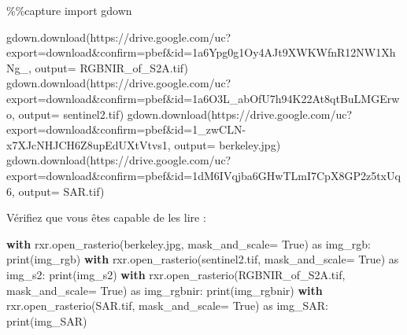 \documentclass[
  11pt,
  letterpaper,
  open=any,
  twoside=false,
  french]{scrbook}
\newenvironment{Shaded}{\begin{snugshade}}{\end{snugshade}}
\newcommand{\BuiltInTok}[1]{\textcolor[rgb]{0.00,0.23,0.31}{#1}}
\newcommand{\ControlFlowTok}[1]{\textcolor[rgb]{0.00,0.23,0.31}{\textbf{#1}}}
\newcommand{\ImportTok}[1]{\textcolor[rgb]{0.00,0.46,0.62}{#1}}
\newcommand{\NormalTok}[1]{\textcolor[rgb]{0.00,0.23,0.31}{#1}}
\newcommand{\OperatorTok}[1]{\textcolor[rgb]{0.37,0.37,0.37}{#1}}
\newcommand{\StringTok}[1]{\textcolor[rgb]{0.13,0.47,0.30}{#1}}
\newcommand{\VariableTok}[1]{\textcolor[rgb]{0.07,0.07,0.07}{#1}}
\begin{document}
\begin{Shaded}
\begin{Highlighting}[]
\OperatorTok{\%\%}\NormalTok{capture}
\ImportTok{import}\NormalTok{ gdown}

\NormalTok{gdown.download(}\StringTok{\textquotesingle{}https://drive.google.com/uc?export=download\&confirm=pbef\&id=1a6Ypg0g1Oy4AJt9XWKWfnR12NW1XhNg\_\textquotesingle{}}\NormalTok{, output}\OperatorTok{=} \StringTok{\textquotesingle{}RGBNIR\_of\_S2A.tif\textquotesingle{}}\NormalTok{)}
\NormalTok{gdown.download(}\StringTok{\textquotesingle{}https://drive.google.com/uc?export=download\&confirm=pbef\&id=1a6O3L\_abOfU7h94K22At8qtBuLMGErwo\textquotesingle{}}\NormalTok{, output}\OperatorTok{=} \StringTok{\textquotesingle{}sentinel2.tif\textquotesingle{}}\NormalTok{)}
\NormalTok{gdown.download(}\StringTok{\textquotesingle{}https://drive.google.com/uc?export=download\&confirm=pbef\&id=1\_zwCLN{-}x7XJcNHJCH6Z8upEdUXtVtvs1\textquotesingle{}}\NormalTok{, output}\OperatorTok{=} \StringTok{\textquotesingle{}berkeley.jpg\textquotesingle{}}\NormalTok{)}
\NormalTok{gdown.download(}\StringTok{\textquotesingle{}https://drive.google.com/uc?export=download\&confirm=pbef\&id=1dM6IVqjba6GHwTLmI7CpX8GP2z5txUq6\textquotesingle{}}\NormalTok{, output}\OperatorTok{=} \StringTok{\textquotesingle{}SAR.tif\textquotesingle{}}\NormalTok{)}
\end{Highlighting}
\end{Shaded}

Vérifiez que vous êtes capable de les lire :

\begin{Shaded}
\begin{Highlighting}[]
\ControlFlowTok{with}\NormalTok{ rxr.open\_rasterio(}\StringTok{\textquotesingle{}berkeley.jpg\textquotesingle{}}\NormalTok{, mask\_and\_scale}\OperatorTok{=} \VariableTok{True}\NormalTok{) }\ImportTok{as}\NormalTok{ img\_rgb:}
    \BuiltInTok{print}\NormalTok{(img\_rgb)}
\ControlFlowTok{with}\NormalTok{ rxr.open\_rasterio(}\StringTok{\textquotesingle{}sentinel2.tif\textquotesingle{}}\NormalTok{, mask\_and\_scale}\OperatorTok{=} \VariableTok{True}\NormalTok{) }\ImportTok{as}\NormalTok{ img\_s2:}
    \BuiltInTok{print}\NormalTok{(img\_s2)}
\ControlFlowTok{with}\NormalTok{ rxr.open\_rasterio(}\StringTok{\textquotesingle{}RGBNIR\_of\_S2A.tif\textquotesingle{}}\NormalTok{, mask\_and\_scale}\OperatorTok{=} \VariableTok{True}\NormalTok{) }\ImportTok{as}\NormalTok{ img\_rgbnir:}
    \BuiltInTok{print}\NormalTok{(img\_rgbnir)}
\ControlFlowTok{with}\NormalTok{ rxr.open\_rasterio(}\StringTok{\textquotesingle{}SAR.tif\textquotesingle{}}\NormalTok{, mask\_and\_scale}\OperatorTok{=} \VariableTok{True}\NormalTok{) }\ImportTok{as}\NormalTok{ img\_SAR:}
    \BuiltInTok{print}\NormalTok{(img\_SAR)}
\end{Highlighting}
\end{Shaded}
\end{document}
